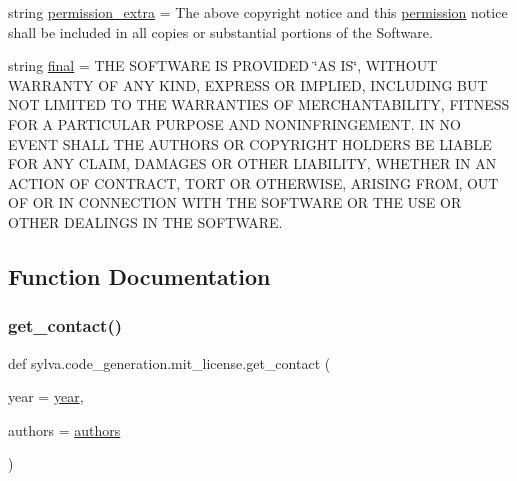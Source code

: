 \begin{DoxyCompactItemize}
\item 
string \hyperlink{namespacesylva_1_1code__generation_1_1mit__license_ae51b5f9d271cf247681c95af29079e5a}{permission\+\_\+extra} = \textquotesingle{}The above copyright notice and this \hyperlink{namespacesylva_1_1code__generation_1_1mit__license_af67ea5ac7bf8aeac183aefb908f601e2}{permission} notice shall be included in all copies or substantial portions of the Software.\textquotesingle{}
\item 
string \hyperlink{namespacesylva_1_1code__generation_1_1mit__license_a27244f1a7bc13b260c9a5bed16b1d438}{final} = \textquotesingle{}T\+HE S\+O\+F\+T\+W\+A\+RE IS P\+R\+O\+V\+I\+D\+ED \char`\"{}AS IS\char`\"{}, W\+I\+T\+H\+O\+UT W\+A\+R\+R\+A\+N\+TY OF A\+NY K\+I\+ND, E\+X\+P\+R\+E\+SS OR I\+M\+P\+L\+I\+ED, I\+N\+C\+L\+U\+D\+I\+NG B\+UT N\+OT L\+I\+M\+I\+T\+ED TO T\+HE W\+A\+R\+R\+A\+N\+T\+I\+ES OF M\+E\+R\+C\+H\+A\+N\+T\+A\+B\+I\+L\+I\+TY, F\+I\+T\+N\+E\+SS F\+OR A P\+A\+R\+T\+I\+C\+U\+L\+AR P\+U\+R\+P\+O\+SE A\+ND N\+O\+N\+I\+N\+F\+R\+I\+N\+G\+E\+M\+E\+N\+T. IN NO E\+V\+E\+NT S\+H\+A\+LL T\+HE A\+U\+T\+H\+O\+RS OR C\+O\+P\+Y\+R\+I\+G\+HT H\+O\+L\+D\+E\+RS BE L\+I\+A\+B\+LE F\+OR A\+NY C\+L\+A\+IM, D\+A\+M\+A\+G\+ES OR O\+T\+H\+ER L\+I\+A\+B\+I\+L\+I\+TY, W\+H\+E\+T\+H\+ER IN AN A\+C\+T\+I\+ON OF C\+O\+N\+T\+R\+A\+CT, T\+O\+RT OR O\+T\+H\+E\+R\+W\+I\+SE, A\+R\+I\+S\+I\+NG F\+R\+OM, O\+UT OF OR IN C\+O\+N\+N\+E\+C\+T\+I\+ON W\+I\+TH T\+HE S\+O\+F\+T\+W\+A\+RE OR T\+HE U\+SE OR O\+T\+H\+ER D\+E\+A\+L\+I\+N\+GS IN T\+HE S\+O\+F\+T\+W\+A\+R\+E.\textquotesingle{}
\end{DoxyCompactItemize}


\subsection{Function Documentation}
\mbox{\label{namespacesylva_1_1code__generation_1_1mit__license_a7cf6054f669c578c4c64370849e8edc2}} 
\subsubsection{\texorpdfstring{get\+\_\+contact()}{get\_contact()}}
{\footnotesize\ttfamily def sylva.\+code\+\_\+generation.\+mit\+\_\+license.\+get\+\_\+contact (\begin{DoxyParamCaption}\item[{}]{year = {\ttfamily \hyperlink{namespacesylva_1_1code__generation_1_1mit__license_a4902e976e16e0ac4d890af277506dc41}{year}},  }\item[{}]{authors = {\ttfamily \hyperlink{namespacesylva_1_1code__generation_1_1mit__license_ab235b5262a6f93e7dcdef3c73e16621a}{authors}} }\end{DoxyParamCaption})}

